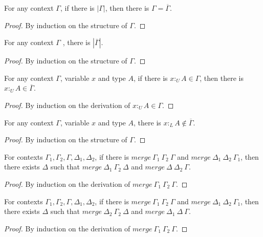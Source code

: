\documentclass[sigplan,screen,review,anonymous]{acmart}
\newcommand{\pure}[1]{|#1|}
\newcommand{\utype}{:_{\scriptscriptstyle U}}
\newcommand{\ltype}{:_{\scriptscriptstyle L}}
\newcommand{\mrg}[3]{merge\ {#1}\ {#2}\ {#3}}
\begin{document}
\begin{lemma}\label{purere}
  For any context $\Gamma$, if there is $\pure{\Gamma}$, then there is $\Gamma = \overline{\Gamma}$.
\end{lemma}
\begin{proof}
  By induction on the structure of $\Gamma$.
\end{proof}

\begin{lemma}\label{repure}
  For any context $\Gamma$ , there is $\pure{\overline{\Gamma}}$.
\end{lemma}
\begin{proof}
  By induction on the structure of $\Gamma$.
\end{proof}

\begin{lemma}\label{hasure}
  For any context $\Gamma$, variable $x$ and type $A$, if there is $x \utype A \in \Gamma$, then there is $x \utype A \in \overline{\Gamma}$.
\end{lemma}
\begin{proof}
  By induction on the derivation of $x \utype A \in \Gamma$.
\end{proof}

\begin{lemma}\label{haslre}
  For any context $\Gamma$, variable $x$ and type $A$, there is $x \ltype A \notin \overline{\Gamma}$.
\end{lemma}
\begin{proof}
  By induction on the structure of $\Gamma$.
\end{proof}

\begin{lemma}\label{mergesplit1}
  For contexts $\Gamma_1, \Gamma_2, \Gamma, \Delta_1, \Delta_2$, if there is $\mrg{\Gamma_1}{\Gamma_2}{\Gamma}$ and $\mrg{\Delta_1}{\Delta_2}{\Gamma_1}$, then there exists $\Delta$ such that $\mrg{\Delta_1}{\Gamma_2}{\Delta}$ and $\mrg{\Delta}{\Delta_2}{\Gamma}$.
\end{lemma}
\begin{proof}
  By induction on the derivation of $\mrg{\Gamma_1}{\Gamma_2}{\Gamma}$.
\end{proof}

\begin{lemma}
  For contexts $\Gamma_1, \Gamma_2, \Gamma, \Delta_1, \Delta_2$, if there is $\mrg{\Gamma_1}{\Gamma_2}{\Gamma}$ and $\mrg{\Delta_1}{\Delta_2}{\Gamma_1}$, then there exists $\Delta$ such that $\mrg{\Delta_2}{\Gamma_2}{\Delta}$ and $\mrg{\Delta_1}{\Delta}{\Gamma}$.
\end{lemma}
\begin{proof}
  By induction on the derivation of $\mrg{\Gamma_1}{\Gamma_2}{\Gamma}$.
\end{proof}
\end{document}
